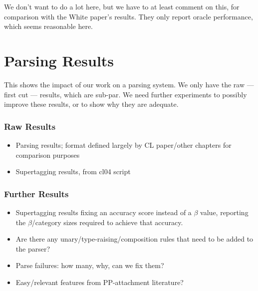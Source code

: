 We don't want to do a lot here, but we have to at least comment on this, for comparison with the White paper's results. They only report oracle performance, which seems reasonable here.

\section{Parsing Results}

This shows the impact of our work on a parsing system. We only have the raw --- first cut --- results, which are sub-par. We need further experiments to possibly improve these results, or to show why they are adequate.

\subsubsection{Raw Results}

\begin{itemize}
\item Parsing results; format defined largely by CL paper/other chapters for comparison purposes
\item Supertagging results, from cl04 script
\end{itemize}

\subsubsection{Further Results}

\begin{itemize}
\item Supertagging results fixing an accuracy score instead of a $\beta$ value, reporting the $\beta$/category sizes required to achieve that accuracy.
\item Are there any unary/type-raising/composition rules that need to be added to the parser?
\item Parse failures: how many, why, can we fix them?
\item Easy/relevant features from PP-attachment literature?
\end{itemize}


